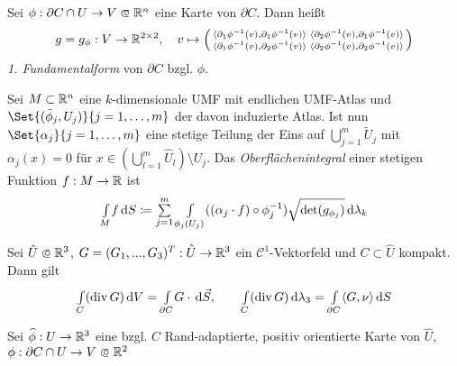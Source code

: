 \documentclass{cheat-sheet}
\DeclareMathOperator{\divergence}{div} %
\newcommand{\Cont}{\mathcal{C}} %
\theoremstyle{definition}
\begin{document}
\begin{defn}
  Sei $\phi : \partial C \cap U \to V \opn \R^n$ eine Karte von $\partial C$. Dann heißt
  \[
    g = g_\phi : V \to \mathbb{R}^{2 \times 2}, \quad
    v \mapsto \left( \begin{smallmatrix}
      \langle \partial_1 \phi^{-1}(v), \partial_1 \phi^{-1}(v) \rangle &
      \langle \partial_2 \phi^{-1}(v), \partial_1 \phi^{-1}(v) \rangle \\
      \langle \partial_1 \phi^{-1}(v), \partial_2 \phi^{-1}(v) \rangle &
      \langle \partial_2 \phi^{-1}(v), \partial_2 \phi^{-1}(v) \rangle
    \end{smallmatrix} \right)
  \]
  \emph{1. Fundamentalform} von $\partial C$ bzgl. $\phi$.
\end{defn}

\begin{defn}
  Sei $M \subset \mathbb{R}^n$ eine $k$-dimensionale UMF mit endlichen UMF-Atlas und $\Set{(\tilde{\phi}_j, U_j)}{j=1, \ldots, m}$ der davon induzierte Atlas. Ist nun $\Set{\alpha_j}{j = 1, \ldots ,m}$ eine stetige Teilung der Eins auf $\bigcup_{j=1}^m \tilde{U}_j$ mit $\alpha_j(x) = 0$ für $x \in (\bigcup_{l=1}^m \hat{U}_l) \setminus U_j$.
  Das \emph{Oberflächenintegral} einer stetigen Funktion $f : M \to \mathbb{R}$ ist
  \[ \Int{M}{}{f}{S} \coloneqq \sum_{j=1}^m \Int{\phi_j(U_j)}{}{((\alpha_j \cdot f) \circ \phi_j^{-1}) \sqrt{\det(g_{\phi_j})}}{\lambda_k} \]
\end{defn}

\begin{satz}
  Sei $\hat{U} \opn \R^3$, $G = (G_1, ..., G_3)^T : \hat{U} \to \mathbb{R}^3$ ein $\Cont^1$-Vektorfeld und $C \subset \hat{U}$ kompakt. Dann gilt
  \[
    \Int{C}{}{(\divergence G)}{V} = \Int{\partial C}{}{G \cdot}{\vec{S}}, \qquad
    \Int{C}{}{(\divergence G)}{\lambda_3} = \Int{\partial C}{}{\langle G, \nu \rangle}{S}
  \]
\end{satz}

\iffalse
  Gegeben durch:
  $u(x) \coloneqq \sum_{j=1}^n \det(e_j, \partial_1 \phi^{-1}(\phi(x)), \ldots, \partial_{n {-} 1} \phi^{-1} (\phi(x))) e_j$
  $\nu(x) \coloneqq \tfrac{u(x)}{\norm{u(x)}}$ (unabhängig von pos. orientierter Karte)
  Im Fall $n = 3$ ist $u(x) = \partial_1 \phi^{-1}(\phi(x)) \times \partial_x \phi^{-1}(\phi(x))$
  Im Fall $n=3$:
  $G = (G_1, G_2, G_3) : \widehat{U} \to \R^3$ $\Cont^1$, $\widehat{U} \opn \R^3$
  Bekannt: $\d (G \cdot \d S) = \divergence (G) \d V$
\fi

\iffalse
  Sei $\widehat{\phi} : U \to \mathbb{R}^3$ eine bzgl. $C$ Rand-adaptierte, positiv orientierte Karte von $\widehat{U}$, $\phi : \partial C \cap U \to V \opn \R^2$
\end{document}
